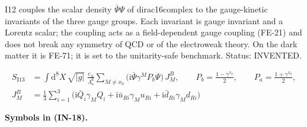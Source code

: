 \documentclass[
  10pt,
]{article}
\begin{document}
I12 couples the scalar density \(\bar\Psi\Psi\) of dirac16complex to the
gauge-kinetic invariants of the three gauge groups. Each invariant is
gauge invariant and a Lorentz scalar; the coupling acts as a
field-dependent gauge coupling (FE-21) and does not break any symmetry
of QCD or of the electroweak theory. On the dark matter it is FE-71; it
is set to the unitarity-safe benchmark. Status: INVENTED.

\[
\begin{aligned}
S_{\mathrm{I13}} &= \int\mathrm{d}^8X\,\sqrt{\lvert g\rvert}\;\frac{c_{\mathrm{A}}}{\Lambda_\star^6}
 \sum_{M\ne x_0}\big(\mathrm{i}\bar\Psi\gamma^MP_b\Psi\big)\,J^{B}_M,\qquad P_b = \frac{1 - \gamma^{x_0}}{2},
 \qquad P_a = \frac{1 + \gamma^{x_0}}{2},\\
J^{B}_M &= \frac13\sum_{i=1}^{3}\big(\mathrm{i}\bar Q_i\gamma_MQ_i + \mathrm{i}\bar u_{Ri}\gamma_Mu_{Ri}
 + \mathrm{i}\bar d_{Ri}\gamma_Md_{Ri}\big)
\end{aligned} \tag{IN-18}
\]

\textbf{Symbols in (IN-18).}
\end{document}
